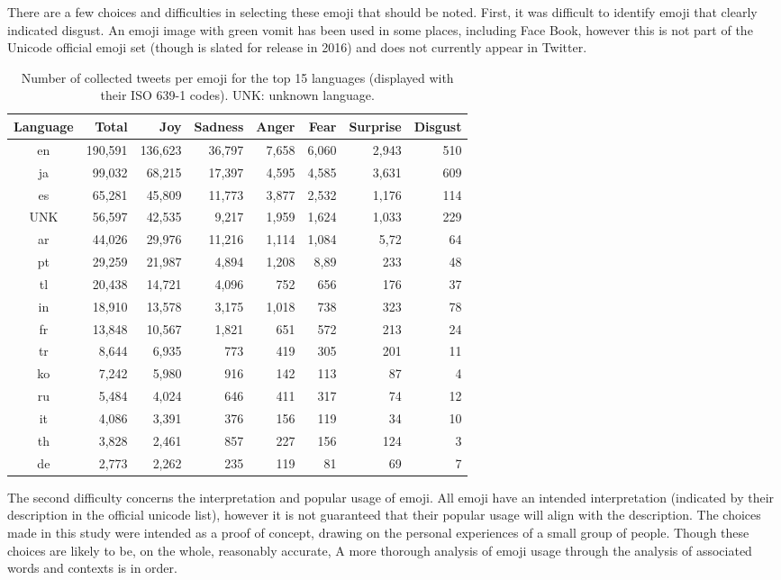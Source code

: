 \documentclass[10pt, a4paper]{article}
\begin{document}
There are a few choices and difficulties in selecting these emoji that should be noted.
First, it was difficult to identify emoji that clearly indicated disgust. 
An emoji image with green vomit has been used in some places, including Face Book, however this is not part of the Unicode official emoji set (though is slated for release in 2016) and does not currently appear in Twitter.

\begin{table*}[!ht]
\centering
	\begin{tabular}{c | r | r | r | r | r | r | r}
\textbf{Language} & \textbf{Total} & \textbf{Joy} & \textbf{Sadness} & \textbf{Anger} & \textbf{Fear} & \textbf{Surprise} & \textbf{Disgust}  \\\hline
en  & 190,591 & 136,623 & 36,797 & 7,658 & 6,060 & 2,943 & 510 \\
ja  & 99,032 & 68,215 & 17,397 & 4,595 & 4,585 & 3,631 & 609 \\
es  & 65,281 & 45,809 & 11,773 & 3,877 & 2,532 & 1,176 & 114 \\
UNK  & 56,597 & 42,535 & 9,217 & 1,959 & 1,624 & 1,033 & 229\\
ar  & 44,026 & 29,976 & 11,216 & 1,114 & 1,084 & 5,72 & 64 \\
pt  & 29,259 & 21,987 & 4,894 & 1,208 & 8,89 & 233 & 48 \\
tl  & 20,438 & 14,721 & 4,096 & 752 & 656 & 176 & 37 \\
in  & 18,910 & 13,578 & 3,175 & 1,018 & 738 & 323 & 78 \\
fr  & 13,848 & 10,567 & 1,821 & 651 & 572 & 213 & 24\\
tr  & 8,644 & 6,935 & 773 & 419 & 305 & 201 & 11\\
ko  & 7,242 & 5,980 & 916 & 142 & 113 & 87 & 4\\
ru  & 5,484 & 4,024 & 646 & 411 & 317 & 74 & 12\\
it  & 4,086 & 3,391 & 376 & 156 & 119 & 34 & 10 \\
th  & 3,828 & 2,461 & 857 & 227 & 156 & 124 & 3\\
de  & 2,773 & 2,262 & 235 & 119 & 81 & 69 & 7
\end{tabular}
	\caption{Number of collected tweets per emoji for the top 15 languages (displayed with their ISO 639-1 codes). UNK: unknown language.}
	\label{tbl:top-ten-langs}
\end{table*}

The second difficulty concerns the interpretation and popular usage of emoji. 
All emoji have an intended interpretation (indicated by their description in the official unicode list), however it is not guaranteed that their popular usage will align with the description. 
The choices made in this study were intended as a proof of concept, drawing on the personal experiences of a small group of people. 
Though these choices are likely to be, on the whole, reasonably accurate, 
A more thorough analysis of 
emoji usage through the analysis of associated words and contexts is in order. 
\end{document}
